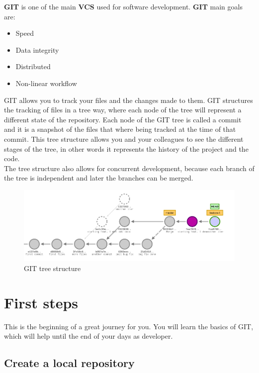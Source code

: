 \documentclass{article}
\begin{document}
\textbf{GIT} is one of the main \textbf{VCS} used for software development. \textbf{GIT} main goals are:

\begin{itemize}
\item{Speed}
\item{Data integrity}
\item{Distributed}
\item{Non-linear workflow}
\end{itemize}

GIT allows you to track your files and the changes made to them. GIT structures the tracking of files in a tree way, where each node of the tree will represent a different state of the repository. Each node of the GIT tree is called a commit and it is a snapshot of the files that where being tracked at the time of that commit. This tree structure allows you and your colleagues to see the different stages of the tree, in other words it represents the history of the project and the code.\\
The tree structure also allows for concurrent development, because each branch of the tree is independent and later the branches can be merged.

\begin{figure}[H]
\centerline{\includegraphics[scale=0.5]{repository_after_rebase.png}}
\caption{GIT tree structure}
\label{fig1}
\end{figure}

\section{First steps}

This is the beginning of a great journey for you. You will learn the basics of GIT, which will help until the end of your days as developer.

\subsection{Create a local repository}
\end{document}
